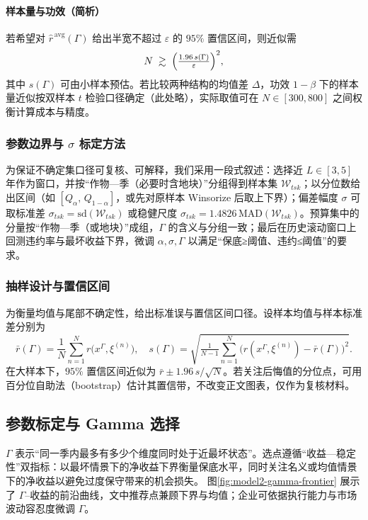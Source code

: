 \paragraph{样本量与功效（简析）}
若希望对 $\widehat r^{\,\mathrm{avg}}(\Gamma)$ 给出半宽不超过 $\varepsilon$ 的 $95\%$ 置信区间，则近似需
\begin{equation}
  N \;\gtrsim\; \Bigl(\tfrac{1.96\,s(\Gamma)}{\varepsilon}\Bigr)^2,\label{eq:sample-size}
\end{equation}
其中 $s(\Gamma)$ 可由小样本预估。若比较两种结构的均值差 $\Delta$，功效 $1-\beta$ 下的样本量近似按双样本 $t$ 检验口径确定（此处略），实际取值可在 $N\in[300,800]$ 之间权衡计算成本与精度。

\subsubsection{参数边界与 \texorpdfstring{$\sigma$}{sigma} 标定方法}
为保证不确定集口径可复核、可解释，我们采用一段式叙述：选择近 $L\in[3,5]$ 年作为窗口，并按“作物—季（必要时含地块）”分组得到样本集 $\mathcal W_{tsk}$；以分位数给出区间（如 $[Q_{\alpha},\,Q_{1-\alpha}]$，或先对原样本 Winsorize 后取上下界）；偏差幅度 $\sigma$ 可取标准差 $\sigma_{tsk}=\mathrm{sd}(\mathcal W_{tsk})$ 或稳健尺度 $\sigma_{tsk}=1.4826\,\mathrm{MAD}(\mathcal W_{tsk})$。预算集中的分量按“作物—季（或地块）”成组，$\Gamma$ 的含义与分组一致；最后在历史滚动窗口上回测违约率与最坏收益下界，微调 $\alpha,\sigma,\Gamma$ 以满足“保底≥阈值、违约≤阈值”的要求。

\subsubsection{抽样设计与置信区间}
为衡量均值与尾部不确定性，给出标准误与置信区间口径。设样本均值与样本标准差分别为
\begin{equation}
  \bar r(\Gamma)=\frac{1}{N}\sum_{n=1}^N r\bigl(x^\Gamma,\xi^{(n)}\bigr),\quad
  s(\Gamma)=\sqrt{\tfrac{1}{N-1}\sum_{n=1}^N \bigl(r(x^\Gamma,\xi^{(n)})-\bar r(\Gamma)\bigr)^2}.
\end{equation}
在大样本下，$95\%$ 置信区间近似为 $\bar r\pm1.96\,s/\sqrt{N}$。若关注后悔值的分位点，可用百分位自助法（bootstrap）估计其置信带，不改变正文图表，仅作为复核材料。

\subsection{参数标定与 Gamma 选择}
$\Gamma$ 表示“同一季内最多有多少个维度同时处于近最坏状态”。选点遵循“收益—稳定性”双指标：以最坏情景下的净收益下界衡量保底水平，同时关注名义或均值情景下的净收益以避免过度保守带来的机会损失。
图\ref{fig:model2-gamma-frontier} 展示了 $\Gamma$–收益的前沿曲线，文中推荐点兼顾下界与均值；企业可依据执行能力与市场波动容忍度微调 $\Gamma$。
